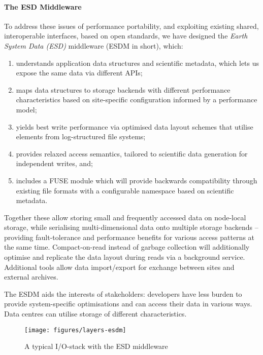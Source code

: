 \paragraph {The ESD Middleware}
To address these issues of performance portability, and exploiting existing shared, interoperable interfaces, based on open standards, we have designed the \textit{Earth System Data (ESD)} middleware (ESDM in short), which:
\begin{enumerate}
	\item understands application data structures and scientific metadata, which lets us expose the same data via different APIs;
	\item maps data structures to storage backends with different performance characteristics based on site-specific configuration informed by a performance model;
	\item yields best write performance via optimised data layout schemes that utilise elements from log-structured file systems;
	\item provides relaxed access semantics, tailored to scientific data generation for independent writes, and;
	\item includes a FUSE module which will provide backwards compatibility through existing file formats with a configurable namespace based on scientific metadata.
\end{enumerate}

Together these allow storing small and frequently accessed data on node-local storage, while serialising multi-dimensional data onto multiple storage backends -- providing fault-tolerance and performance benefits for various access patterns at the same time.
Compact-on-read instead of garbage collection will additionally optimise and replicate the data layout during reads via a background service.
Additional tools allow data import/export for exchange between sites and external archives.

The ESDM aids the interests of stakeholders: developers have less burden to provide system-specific optimisations and can access their data in various ways.
Data centres can utilise storage of different characteristics.

\bigskip


\begin{figure}[bp]
	\centering
	\texttt{[image: figures/layers-esdm]}
	\caption{A typical I/O-stack with the ESD middleware}
	\label{fig:architecture-esd-layering}
\end{figure}

